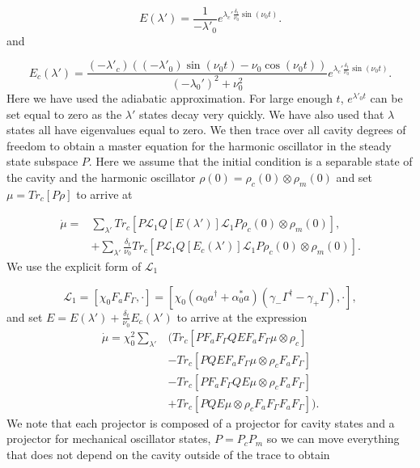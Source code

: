 \documentclass[reprint, amsmath,amssymb, aps,pra]{revtex4-1}
\begin{document}
\begin{equation}
E(\lambda') = \frac{1}{-\lambda'_0}e^{\lambda_c'\frac{\delta_t}{\nu_0}\sin(\nu_0t)}.
\end{equation} and

\begin{equation}
E_c(\lambda')=\frac{(-\lambda'_c)((-\lambda'_0)\sin(\nu_0 t)-\nu_0\cos(\nu_0t))}{(-\lambda_0')^2 + \nu_0^2}e^{\lambda_c'\frac{\delta_t}{\nu_0}\sin(\nu_0t)}.
\end{equation} Here we have used the adiabatic approximation. For large enough $t$, $e^{\lambda'_0t}$ can be set equal to zero as the $\lambda'$ states decay very quickly.  We have also used that $\lambda$ states all have eigenvalues equal to zero. We then trace over all cavity degrees of freedom to obtain a master equation for the harmonic oscillator in the steady state subspace $P$. Here we assume that the initial condition is a separable state of the cavity and the harmonic oscillator $\rho(0)=\rho_{c}(0)\otimes\rho_{m}(0)$  and  set $\mu = Tr_c[P\rho]$ to arrive at 

\begin{align}
\dot{\mu}=&\sum_{\lambda'}Tr_c[P \mathcal{L}_1Q[E(\lambda')]\mathcal{L}_1P\rho_{c}(0)\otimes\rho_{m}(0) ],\\
&+\sum_{\lambda'}\frac{\delta_t}{\nu_0}Tr_c[P\mathcal{L}_1Q[E_c(\lambda')]\mathcal{L}_1P\rho_{c}(0)\otimes\rho_{m}(0) ]\nonumber.
\end{align}
We use the explicit form of $\mathcal{L}_1$ 

\begin{equation}
\mathcal{L}_1 = [\chi_0 F_aF_\Gamma,\cdot] = [\chi_0(\alpha_0 a^\dagger + \alpha_0^* a)(\gamma_-\Gamma^\dagger-\gamma_+\Gamma),\cdot],
\end{equation}
and set $E= E(\lambda') +\frac{\delta_t}{\nu_0} E_c(\lambda')$ to
arrive at the expression
\begin{align*}
\dot{\mu} = \chi_0^2 \sum_{\lambda'}&( Tr_c[PF_aF_\Gamma QEF_aF_\Gamma \mu \otimes \rho_{c}]\\
&- Tr_c[PQEF_aF_\Gamma\mu \otimes \rho_{c} F_aF_\Gamma ]\nonumber \\
&-Tr_c[PF_aF_\Gamma QE\mu \otimes \rho_{c} F_aF_\Gamma ] \nonumber\\ 
&+Tr_c[PQE\mu \otimes \rho_{c}F_aF_\Gamma  F_aF_\Gamma ]). \nonumber
\end{align*}
We note that each projector is composed of a projector for cavity
states and a projector for mechanical oscillator states, $P=P_c P_m$
so we can move everything that does not depend on the cavity outside
of the trace to obtain
\end{document}
